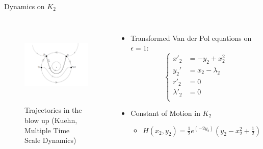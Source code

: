 \documentclass[11pt]{beamer}
\begin{document}
\begin{frame}{Dynamics on $K_2$}
\begin{columns}
\begin{figure}
    \centering
\includegraphics[height=4cm,width=5cm]{Images/pres-cancard}
	\caption{Trajectories in the blow up (Kuehn, Multiple Time Scale Dynamics)}
\end{figure}
\begin{itemize}
\item Transformed Van der Pol equations on $ \epsilon=1$:
\begin{equation*}
    \begin{cases}
        x'_2&=-y_2+x_2^2\\
         y_2'&=x_2-\lambda_2\\
        r'_2&=0\\
        \lambda'_2&=0\\
    \end{cases}
\end{equation*}
\item Constant of Motion in $ K_2 $
\begin{itemize}
	\item $H(x_2,y_2)=\frac{1}{2}e^{(-2y_2)}\left(y_2-x^2_2+\frac{1}{2}\right)$
\end{itemize}

\end{itemize}
\end{columns}
\end{frame}
\end{document}
